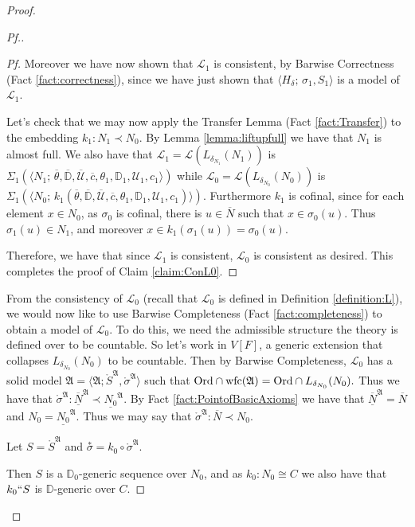 \documentclass{amsart}
\theoremstyle{definition}
\theoremstyle{remark}
\newcommand{\D}{\mathbb{D}}
\newcommand{\N}{{\overline{N}}}
\newcommand{\U}{\mathcal{U}}
\newcommand{\Ord}{\textup{\ensuremath{\text{Ord}}}}
\DeclareMathOperator{\wfc}{wfc}
\begin{document}
\begin{proof}
\begin{proof}[Pf.]
\begin{proof}[Pf]
Moreover we have now shown that $\mathcal L_1$ is consistent, by Barwise Correctness (Fact \ref{fact:correctness}), since we have just shown that $\langle H_{\delta}; \, \sigma_1, S_1 \rangle$ is a model of $\mathcal L_1$.

Let's check that we may now apply the Transfer Lemma (Fact \ref{fact:Transfer}) to the embedding $k_1:N_1 \prec N_0$. By Lemma \ref{lemma:liftupfull} we have that $N_1$ is almost full. We also have that $\mathcal L_1 = \mathcal L(L_{\delta_{N_1}}(N_1))$ is 
	$\text{$\Sigma_1(\langle N_1; \, \overline \theta, \overline{\D}, \overline{\U}, \overline c, \theta_1, \D_1, \U_1, c_1 \rangle)$}$ while $\mathcal L_0=\mathcal L(L_{\delta_{N_0}}(N_0))$ is 
	$\text{$\Sigma_1(\langle N_0;\,k_1(\overline \theta, \overline{\D}, \overline{\U}, \overline c, \theta_1, \D_1, \U_1, c_1)\rangle)$.}$
Furthermore $k_1$ is cofinal, since for each element $x \in N_0$, as $\sigma_0$ is cofinal, there is $u \in \N$ such that $x \in \sigma_0(u)$. Thus $\sigma_1(u) \in N_1$, and moreover $x \in k_1(\sigma_1(u))=\sigma_0(u)$. 

Therefore, we have that since $\mathcal L_1$ is consistent, $\mathcal L_0$ is consistent as desired. This completes the proof of Claim \ref{claim:ConL0}. \end{proof}

From the consistency of $\mathcal L_0$ (recall that $\mathcal L_0$ is defined in Definition \ref{definition:L}), we would now like to use Barwise Completeness (Fact \ref{fact:completeness}) to obtain a model of $\mathcal L_0$. To do this, we need the admissible structure the theory is defined over to be countable. So let's work in $V[F]$, a generic extension that collapses $L_{\delta_{N_0}}(N_0)$ to be countable. Then by Barwise Completeness, $\mathcal L_0$ has a solid model 
	$\mathfrak A = \langle \mathfrak A; \mathring{S}^{\mathfrak A}, \mathring{\sigma}^{\mathfrak A} \rangle$ such that $\Ord \cap \wfc(\mathfrak A) = \Ord \cap L_{\delta_{N_0}}(N_0).$
Thus we have that $\mathring \sigma^{\mathfrak A}: \overline{\underline N}^{\mathfrak A} \prec \underline{N_0}^{\mathfrak A}$. By Fact \ref{fact:PointofBasicAxioms} we have that $\overline{\underline N}^{\mathfrak A}=\N$ and $N_0=\underline{N_0}^{\mathfrak A}$. Thus we may say that  $\mathring \sigma^{\mathfrak A}: \N \prec N_0$. 

Let $S = \mathring{S}^{\mathfrak A}$ and $\overset{*} {\sigma}=k_0 \circ \mathring{\sigma}^{\mathfrak A}$. 

Then $S$ is a $\D_0$-generic sequence over $N_0$, and as $k_0:N_0 \cong C$ we also have that $k_0``S$ is $\D$-generic over $C$. 


\end{proof}
\end{proof}
\end{document}
